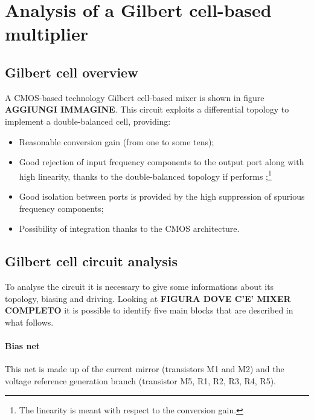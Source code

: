 \section{Analysis of a Gilbert cell-based multiplier }

\subsection{Gilbert cell overview}
A CMOS-based technology Gilbert cell-based mixer is shown in figure \textbf{AGGIUNGI IMMAGINE}. This circuit exploits a differential topology to implement a double-balanced cell, providing:
\begin{itemize}
	\item Reasonable conversion gain (from one to some tens);
	\item Good rejection of input frequency components to the output port along with high linearity, thanks to the double-balanced topology if performs ;\footnote{The linearity is meant with respect to the conversion gain.}
	\item Good isolation between ports is provided by the high suppression of spurious frequency components;
	\item Possibility of integration thanks to the CMOS architecture.
\end{itemize}
\subsection{Gilbert cell circuit analysis}
To analyse the circuit it is necessary to give some informations about its topology, biasing and driving. Looking at\textbf{ FIGURA DOVE C'E' MIXER COMPLETO} it is possible to identify five main blocks that are described in what follows.
\paragraph{Bias net}

This net is made up of the current mirror (transistors M1 and M2) and the voltage reference generation branch (transistor M5, R1, R2, R3, R4, R5). 


